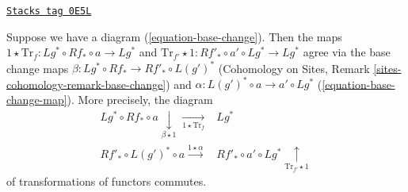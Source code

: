 \begin{lemma}

\label{spaces-duality-lemma-trace-map-and-base-change}
\href{https://stacks.math.columbia.edu/tag/0E5L}{\texttt{Stacks tag 0E5L}}

Suppose we have a diagram (\ref{equation-base-change}).
Then the maps
$1 \star \text{Tr}_f : Lg^* \circ Rf_* \circ a \to Lg^*$ and
$\text{Tr}_{f'} \star 1 : Rf'_* \circ a' \circ Lg^* \to Lg^*$
agree via the base change maps
$\beta : Lg^* \circ Rf_* \to Rf'_* \circ L(g')^*$
(Cohomology on Sites, Remark \ref{sites-cohomology-remark-base-change})
and $\alpha : L(g')^* \circ a \to a' \circ Lg^*$
(\ref{equation-base-change-map}).
More precisely, the diagram
$$
\begin{array}{cc}Lg^* \circ Rf_* \circ a
\underset{\beta \star 1}{\downarrow}\underset{1 \star \text{Tr}_f}{\longrightarrow} & Lg^* \\ Rf'_* \circ L(g')^* \circ a \overset{1 \star \alpha}{\longrightarrow} & Rf'_* \circ a' \circ Lg^* \underset{\text{Tr}_{f'} \star 1}{\uparrow}\end{array}
$$
of transformations of functors commutes.
\end{lemma}

